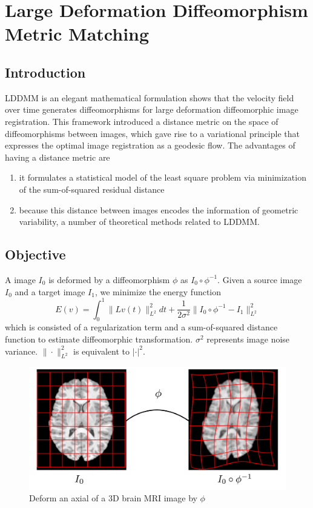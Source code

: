 \documentclass{article}
\theoremstyle{definition}
\theoremstyle{plain}
\begin{document}
\newpage
\section{Large Deformation Diffeomorphism Metric Matching\cite{beg,tang}}
\subsection{Introduction}
LDDMM is an elegant mathematical formulation shows that the velocity field over time generates diffeomorphisms for large deformation diffeomorphic image registration. This framework introduced a distance metric on the space of diffeomorphisms between images, which gave rise to a variational principle that expresses the optimal image registration as a geodesic flow. The advantages of having a distance metric are
\begin{enumerate}
    \item it formulates a statistical model of the least square problem via minimization of the sum-of-squared residual distance
    \item because this distance between images encodes the information of geometric variability, a number of theoretical methods related to LDDMM.
\end{enumerate}

\subsection{Objective}
A image $I_0$ is deformed by a diffeomorphism $\phi$ as $I_0\circ\phi^{-1}$. Given a source image $I_0$ and a target image $I_1$, we minimize the energy function
\begin{equation*}
    E(v)=\int^1_0\|Lv(t)\|^2_{L^2}dt+\frac{1}{2\sigma^2}\|I_0\circ\phi^{-1}-I_1\|^2_{L^2}
\end{equation*}
which is consisted of a regularization term and a sum-of-squared distance function to estimate diffeomorphic transformation. $\sigma^2$ represents image noise variance. $\|\cdot\|^2_{L^2}$ is equivalent to $|\cdot|^2$.
\begin{figure}[H]
\centering
\includegraphics[scale=0.25]{LDDMM.png}
\caption{Deform an axial of a 3D brain MRI image by $\phi$}
\end{figure}
\end{document}
